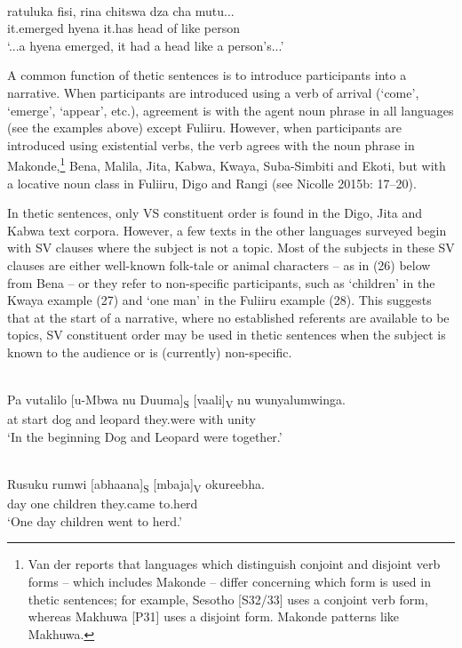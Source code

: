 \documentclass[output=paper]{langsci/langscibook}
\begin{document}
\ea\label{ex:}
\\
\gll ratuluka fisi, rina chitswa dza cha mutu...\\
it.emerged hyena it.has head of like person\\
\upshape
‘...a hyena emerged, it had a head like a person’s...’
\z

A common function of thetic sentences is to introduce participants into a narrative. When participants are introduced using a verb of arrival (‘come’, ‘emerge’, ‘appear’, etc.), agreement is with the agent noun phrase in all languages (see the examples above) except Fuliiru. However, when participants are introduced using existential verbs, the verb agrees with the noun phrase in Makonde,\footnote{Van der \citet{Wal2008} reports that languages which distinguish conjoint and disjoint verb forms – which includes Makonde – differ concerning which form is used in thetic sentences; for example, Sesotho [S32/33] uses a conjoint verb form, whereas Makhuwa [P31] uses a disjoint form. Makonde patterns like Makhuwa.} Bena, Malila, Jita, Kabwa, Kwaya, Suba-Simbiti and Ekoti, but with a locative noun class in Fuliiru, Digo and Rangi (see Nicolle 2015b: 17–20).

In thetic sentences, only VS constituent order is found in the Digo, Jita and Kabwa text corpora. However, a few texts in the other languages surveyed begin with SV clauses where the subject is not a topic. Most of the subjects in these SV clauses are either well-known folk-tale or animal characters – as in (26) below from Bena – or they refer to non-specific participants, such as ‘children’ in the Kwaya example (27) and ‘one man’ in the Fuliiru example (28). This suggests that at the start of a narrative, where no established referents are available to be topics, SV constituent order may be used in thetic sentences when the subject is known to the audience or is (currently) non-specific.

\ea\label{ex:}
\\

\gll Pa vutalilo [u-Mbwa nu Duuma]\textsubscript{S} [vaali]\textsubscript{V} nu wunyalumwinga.\\
at start dog and leopard they.were with unity\\
\upshape
‘In the beginning Dog and Leopard were together.’
\z

\ea\label{ex:}
\\
\gll Rusuku rumwi [abhaana]\textsubscript{S} [mbaja]\textsubscript{V} okureebha.\\
day one children they.came to.herd\\
\upshape
‘One day children went to herd.’
\z
\end{document}
